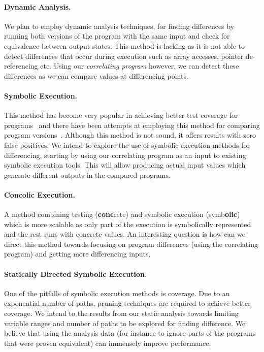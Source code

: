 \paragraph{Dynamic Analysis.} We plan to employ dynamic analysis techniques,
    for finding differences by running both versions of the program with
    the same input and check for equivalence between output states. This
    method is lacking as it is not able to detect differences that occur
    during execution such as array accesses, pointer de-referencing etc. Using our \emph{correlating program} however, we
    can detect these differences as we can compare values at differencing
    points.

\paragraph{Symbolic Execution.} This method has become very popular in
    achieving better test coverage for
    programs~\cite{CadarDunbarEngler08} and there have been attempts at
    employing this method for comparing program
    versions~\cite{EnglerRamos11, HawblitzelKawaguchiLahiriRebelo12,DwyerElbaumPerson08}.
    Although this method is not sound, it offers results with zero false
    positives. We intend to explore the use of symbolic execution methods
    for differencing, starting by using our correlating program as an
    input to existing symbolic execution tools. This will allow producing actual input values which generate different outputs in the compared programs.

\paragraph{Concolic Execution.} A method combining testing (\textbf{conc}rete)
    and symbolic execution (symb\textbf{olic}) which is more scalable as
    only part of the execution is symbolically represented and the rest
    runs with concrete values. An interesting question is how can we
    direct this method towards focusing on program differences (using the
    correlating program) and getting more differencing inputs.

\paragraph{Statically Directed Symbolic Execution.} One of the pitfalls of
    symbolic execution methods is coverage. Due to an exponential number
    of paths, pruning techniques are required to achieve better coverage.
    We intend to the results from our static analysis towards limiting
    variable ranges and number of paths to be explored for finding
    difference. We believe that using the analysis data (for instance to
    ignore parts of the programs that were proven equivalent) can
    immensely improve performance.

